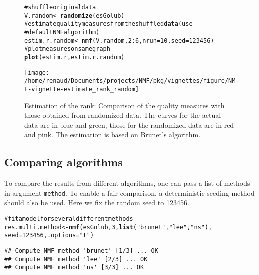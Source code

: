 \documentclass[a4paper]{article}\usepackage{graphicx, color}
\makeatletter
\def\maxwidth{ %
  \ifdim\Gin@nat@width>\linewidth
    \linewidth
  \else
    \Gin@nat@width
  \fi
}
\newcommand{\hlfunctioncall}[1]{\textcolor[rgb]{0.501960784313725,0,0.329411764705882}{\textbf{#1}}}%
\newcommand{\hlstring}[1]{\textcolor[rgb]{0.6,0.6,1}{#1}}%
\newcommand{\hlcomment}[1]{\textcolor[rgb]{0.180392156862745,0.6,0.341176470588235}{#1}}%
\newenvironment{kframe}{%
 \def\at@end@of@kframe{}%
 \ifinner\ifhmode%
  \def\at@end@of@kframe{\end{minipage}}%
  \begin{minipage}{\columnwidth}%
 \fi\fi%
 \def\FrameCommand##1{\hskip\@totalleftmargin \hskip-\fboxsep
 \colorbox{shadecolor}{##1}\hskip-\fboxsep
     \hskip-\linewidth \hskip-\@totalleftmargin \hskip\columnwidth}%
 \MakeFramed {\advance\hsize-\width
   \@totalleftmargin\z@ \linewidth\hsize
   \@setminipage}}%
 {\par\unskip\endMakeFramed%
 \at@end@of@kframe}
\newenvironment{knitrout}{}{} %
\let\code=\texttt
\makeatother
\begin{document}
\begin{figure}
\begin{knitrout}
\color{fgcolor}\begin{kframe}
\begin{alltt}
\hlcomment{# shuffle original data}
V.random <- \hlfunctioncall{randomize}(esGolub)
\hlcomment{# estimate quality measures from the shuffled \hlfunctioncall{data} (use}
\hlcomment{# default NMF algorithm)}
estim.r.random <- \hlfunctioncall{nmf}(V.random, 2:6, nrun = 10, seed = 123456)
\hlcomment{# plot measures on same graph}
\hlfunctioncall{plot}(estim.r, estim.r.random)
\end{alltt}
\end{kframe}\texttt{[image: /home/renaud/Documents/projects/NMF/pkg/vignettes/figure/NMF-vignette-estimate\_rank\_random]} 
\end{knitrout}

\caption{Estimation of the rank: Comparison of the quality measures with those obtained from randomized data. 
The curves for the actual data are in blue and green, those for the randomized data are in red and pink. 
The estimation is based on Brunet's algorithm.}
\label{fig:estim_all_rd}
\end{figure}

\subsection{Comparing algorithms}
To compare the results from different algorithms, one can pass a list of methods in argument \code{method}. 
To enable a fair comparison, a deterministic seeding method should also be used. 
Here we fix the random seed to 123456. 

\begin{knitrout}
\color{fgcolor}\begin{kframe}
\begin{alltt}
\hlcomment{# fit a model for several different methods}
res.multi.method <- \hlfunctioncall{nmf}(esGolub, 3, \hlfunctioncall{list}(\hlstring{"brunet"}, \hlstring{"lee"}, \hlstring{"ns"}), 
    seed = 123456, .options = \hlstring{"t"})
\end{alltt}
\begin{verbatim}
## Compute NMF method 'brunet' [1/3] ... OK
## Compute NMF method 'lee' [2/3] ... OK
## Compute NMF method 'ns' [3/3] ... OK
\end{verbatim}
\end{kframe}
\end{knitrout}
\end{document}
